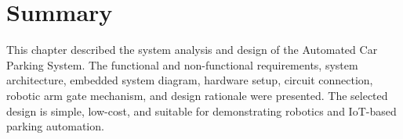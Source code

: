 \section{Summary}

This chapter described the system analysis and design of the Automated Car Parking System. The functional and non-functional requirements, system architecture, embedded system diagram, hardware setup, circuit connection, robotic arm gate mechanism, and design rationale were presented. The selected design is simple, low-cost, and suitable for demonstrating robotics and IoT-based parking automation.

